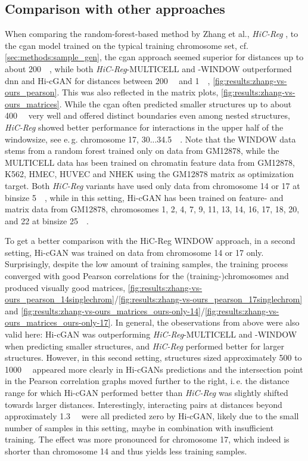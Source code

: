 \subsection{Comparison with other approaches}\label{sec:results:comparison}
When comparing the random-forest-based method by Zhang et al., \emph{HiC-Reg} \cite{Zhang2019}, 
to the \acrshort{cgan} model trained on the typical training chromosome set, cf. \ref{sec:methods:sample_gen},
the \acrshort{cgan} approach seemed superior for distances up to about \SI{200}{\kilo\bp}, 
while both \emph{HiC-Reg}-MULTICELL and -WINDOW outperformed \acrshort{dnn} and Hi-cGAN for distances between 
\SI{200}{\kilo\bp} and \SI{1}{\mega\bp}, \cref{fig:results:zhang-vs-ours_pearson}.
This was also reflected in the matrix plots, \cref{fig:results:zhang-vs-ours_matrices}. 
While the \acrshort{cgan} often predicted smaller structures up to about \SI{400}{\kilo\bp} very well and offered distinct boundaries
even among nested structures, \emph{HiC-Reg} showed better performance for interactions in the upper half of the windowsize,
see e.\,g. chromosome 17, 30...\SI{34.5}{\mega\bp}.
Note that the WINDOW data stems from a random forest trained only on data from GM12878,
while the MULTICELL data has been trained on chromatin feature data from GM12878, K562, HMEC, HUVEC and NHEK using the GM12878 matrix
as optimization target. 
Both \emph{HiC-Reg} variants have used only data from chromosome 14 or 17 at binsize \SI{5}{\kilo\bp},
while in this setting, Hi-cGAN has been trained on feature- and matrix data from GM12878, chromosomes 1, 2, 4, 7, 9, 11, 13, 14, 16, 17, 18, 20, and 22 at binsize \SI{25}{\kilo\bp}.

To get a better comparison with the HiC-Reg WINDOW approach, in a second setting, Hi-cGAN was trained on data from chromosome 14 or 17 only.
Surprisingly, despite the low amount of training samples, the training process converged with good Pearson correlations for the (training\mbox{-})chromosomes and 
produced visually good matrices, \cref{fig:results:zhang-vs-ours_pearson_14singlechrom}/\ref{fig:results:zhang-vs-ours_pearson_17singlechrom} 
and \ref{fig:results:zhang-vs-ours_matrices_ours-only-14}/\ref{fig:results:zhang-vs-ours_matrices_ours-only-17}.
In general, the obeservations from above were also valid here: Hi-cGAN was outperforming \emph{HiC-Reg}-MULTICELL and -WINDOW when predicting smaller structures,
and \emph{HiC-Reg} performed better for larger structures.
However, in this second setting, structures sized approximately 500 to \SI{1000}{\kilo\bp} appeared more clearly in Hi-cGANs predictions 
and the intersection point in the Pearson correlation graphs moved further to the right, i.\,e. the distance range for which Hi-cGAN performed
better than \emph{HiC-Reg} was slightly shifted towards larger distances.
Interestingly, interacting pairs at distances beyond approximately \SI{1.3}{\kilo\bp} were all predicted zero by Hi-cGAN, 
likely due to the small number of samples in this setting, maybe in combination with insufficient training. 
The effect was more pronounced for chromosome 17, which indeed is shorter than chromosome 14 and thus yields less training samples.

